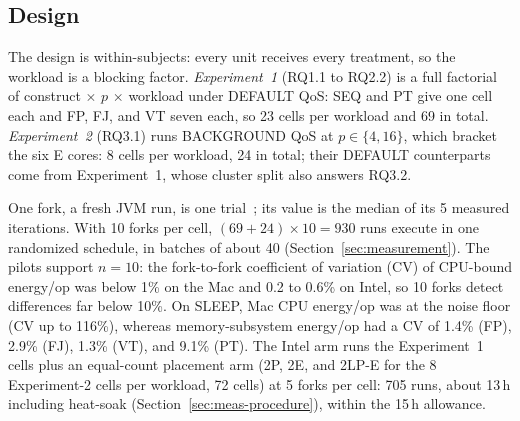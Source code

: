 \subsection{Design}\label{sec:planning-design}
The design is within-subjects: every unit receives every treatment, so the workload is a blocking factor. \emph{Experiment~1} (RQ1.1 to RQ2.2) is a full factorial of construct $\times$ $p$ $\times$ workload under DEFAULT QoS: SEQ and PT give one cell each and FP, FJ, and VT seven each, so 23 cells per workload and 69 in total. \emph{Experiment~2} (RQ3.1) runs BACKGROUND QoS at $p \in \{4, 16\}$, which bracket the six E cores: 8 cells per workload, 24 in total; their DEFAULT counterparts come from Experiment~1, whose cluster split also answers RQ3.2.

One fork, a fresh JVM run, is one trial~\cite{georges2007rigorous}; its value is the median of its 5 measured iterations. With 10 forks per cell, $(69 + 24) \times 10 = 930$ runs execute in one randomized schedule, in batches of about 40 (Section~\ref{sec:measurement}). The pilots support $n = 10$: the fork-to-fork coefficient of variation (CV) of CPU-bound energy/op was below 1\% on the Mac and 0.2 to 0.6\% on Intel, so 10 forks detect differences far below 10\%. On SLEEP, Mac CPU energy/op was at the noise floor (CV up to 116\%), whereas memory-subsystem energy/op had a CV of 1.4\% (FP), 2.9\% (FJ), 1.3\% (VT), and 9.1\% (PT). The Intel arm runs the Experiment~1 cells plus an equal-count placement arm (2P, 2E, and 2LP-E for the 8 Experiment-2 cells per workload, 72 cells) at 5 forks per cell: 705 runs, about 13\,h including heat-soak (Section~\ref{sec:meas-procedure}), within the 15\,h allowance.


